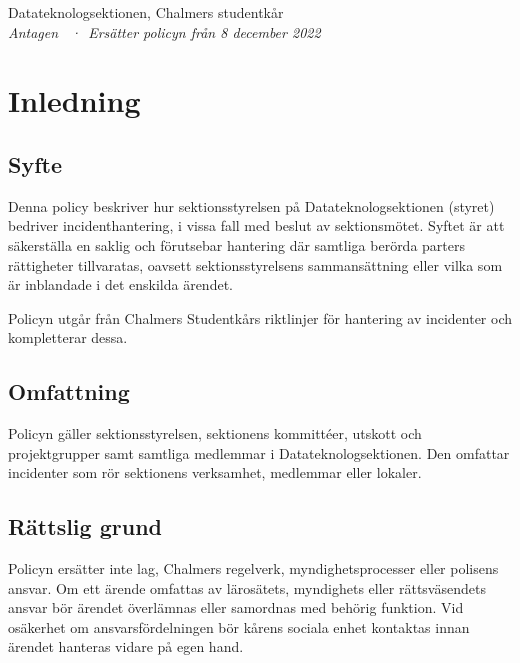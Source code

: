 

\vspace*{14pt}
\noindent{\LARGE\bfseries \dokumenttitel\par}
\vspace{4pt}
\noindent Datateknologsektionen, Chalmers studentkår\\[2pt]
{\itshape Antagen \dokumentdatum\ ·\ Ersätter policyn från 8 december 2022}
\vspace{10pt}

\section{Inledning}

\subsection{Syfte}
Denna policy beskriver hur sektionsstyrelsen på Datateknologsektionen (styret) bedriver incidenthantering, i vissa fall med beslut av sektionsmötet. Syftet är att säkerställa en saklig och förutsebar hantering där samtliga berörda parters rättigheter tillvaratas, oavsett sektionsstyrelsens sammansättning eller vilka som är inblandade i det enskilda ärendet.

Policyn utgår från Chalmers Studentkårs riktlinjer för hantering av incidenter och kompletterar dessa.

\subsection{Omfattning}
Policyn gäller sektionsstyrelsen, sektionens kommittéer, utskott och projektgrupper samt samtliga medlemmar i Datateknologsektionen. Den omfattar incidenter som rör sektionens verksamhet, medlemmar eller lokaler.

\subsection{Rättslig grund}
Policyn ersätter inte lag, Chalmers regelverk, myndighetsprocesser eller polisens ansvar. Om ett ärende omfattas av lärosätets, myndighets eller rättsväsendets ansvar bör ärendet överlämnas eller samordnas med behörig funktion. Vid osäkerhet om ansvarsfördelningen bör kårens sociala enhet kontaktas innan ärendet hanteras vidare på egen hand.


